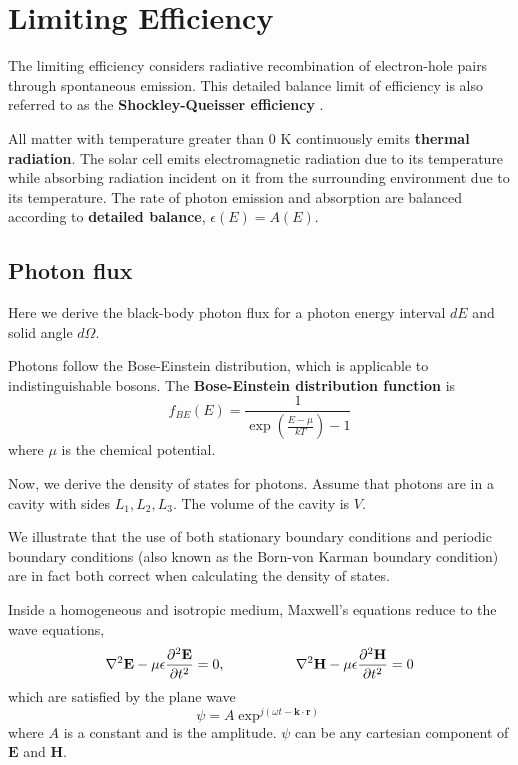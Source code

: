 \documentclass[12pt]{article}
\begin{document}
\section{Limiting Efficiency}

The limiting efficiency considers radiative recombination of electron-hole pairs through spontaneous emission.  
This detailed balance limit of efficiency is also referred to as the \textbf{Shockley-Queisser efficiency} \cite{Shockley:61}.  

All matter with temperature greater than 0 K continuously emits \textbf{thermal radiation}.  The solar cell emits electromagnetic radiation due to its temperature while absorbing radiation incident on it from the surrounding environment due to its temperature.  The rate of photon emission and absorption are balanced according to \textbf{detailed balance}, $\epsilon(E) = A(E)$.    

\subsection{Photon flux}

Here we derive the black-body photon flux for a photon energy interval $dE$ and solid angle $d \Omega$.  

Photons follow the Bose-Einstein distribution, which is applicable to indistinguishable bosons.  The \textbf{Bose-Einstein distribution function} is  
\begin{equation}
f_{BE} (E) = \frac{1}{\exp \left ( \frac{E - \mu}{k T} \right ) - 1} 
\end{equation}
where $\mu$ is the chemical potential.  

Now, we derive the density of states for photons.  
Assume that photons are in a cavity with sides $L_1, L_2, L_3$.  The volume of the cavity is $V$.  

We illustrate that the use of both stationary boundary conditions and periodic boundary conditions  (also known as the Born-von Karman boundary condition) are in fact both correct when calculating the density of states.  

Inside a homogeneous and isotropic medium, Maxwell's equations reduce to the wave equations, 
\begin{equation}
\bold\nabla^2 \mathbf{E} - \mu \epsilon \frac{\partial^2 \mathbf{E}}{\partial t^2} = 0, \hspace{5em} \bold\nabla^2 \mathbf{H} - \mu \epsilon \frac{\partial^2 \mathbf{H}}{\partial t^2} = 0
\end{equation}
which are satisfied by the plane wave
\begin{equation}
\psi = A \exp^{j (\omega t - \mathbf{k} \cdot  \mathbf{r} ) }
\end{equation}
where $A$ is a constant and is the amplitude.  $\psi$ can be any cartesian component of $\mathbf{E}$ and $\mathbf{H}$.  
\end{document}
